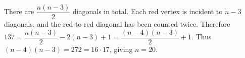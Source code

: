 There are $\dfrac{n(n-3)}{2}$ diagonals in total. Each red vertex is incident to $n-3$ diagonals, and the red-to-red diagonal has been counted twice. Therefore $137=\dfrac{n(n-3)}{2}-2(n-3)+1=\dfrac{(n-4)(n-3)}{2}+1$. Thus $(n-4)(n-3)=272=16\cdot17$, giving $\boxed{n=20}$.

